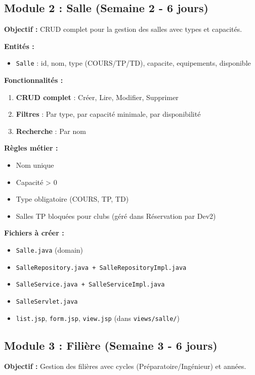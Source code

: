 \documentclass[11pt,a4paper]{article}
\begin{document}
\subsection{Module 2 : Salle (Semaine 2 - 6 jours)}

\textbf{Objectif :} CRUD complet pour la gestion des salles avec types et capacités.

\textbf{Entités :}
\begin{itemize}
    \item \texttt{Salle} : id, nom, type (COURS/TP/TD), capacite, equipements, disponible
\end{itemize}

\textbf{Fonctionnalités :}
\begin{enumerate}
    \item \textbf{CRUD complet} : Créer, Lire, Modifier, Supprimer
    \item \textbf{Filtres} : Par type, par capacité minimale, par disponibilité
    \item \textbf{Recherche} : Par nom
\end{enumerate}

\textbf{Règles métier :}
\begin{itemize}
    \item Nom unique
    \item Capacité > 0
    \item Type obligatoire (COURS, TP, TD)
    \item Salles TP bloquées pour clubs (géré dans Réservation par Dev2)
\end{itemize}

\textbf{Fichiers à créer :}
\begin{itemize}
    \item \texttt{Salle.java} (domain)
    \item \texttt{SalleRepository.java + SalleRepositoryImpl.java}
    \item \texttt{SalleService.java + SalleServiceImpl.java}
    \item \texttt{SalleServlet.java}
    \item \texttt{list.jsp}, \texttt{form.jsp}, \texttt{view.jsp} (dans \texttt{views/salle/})
\end{itemize}

\subsection{Module 3 : Filière (Semaine 3 - 6 jours)}

\textbf{Objectif :} Gestion des filières avec cycles (Préparatoire/Ingénieur) et années.
\end{document}
